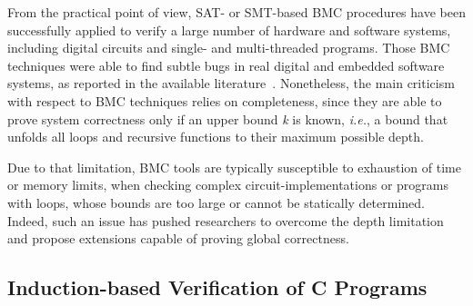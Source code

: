 \documentclass[format=acmsmall, review=false, screen=true]{acmart}
\begin{document}
From the practical point of view, SAT- or SMT-based BMC procedures have been successfully applied to verify a large number of hardware and software systems, including digital circuits and single- and multi-threaded programs. Those BMC techniques were able to find subtle bugs in real digital and embedded software systems, as reported in the available literature~\cite{Clarke04,MerzFS12,CordeiroF11,Ivancic05,Cordeiro12}. Nonetheless, the main criticism with respect to BMC techniques relies on completeness, since they are able to prove system correctness only if an upper bound \textit{k} is known, {\it i.e.}, a bound that unfolds all loops and recursive functions to their maximum possible depth. 

Due to that limitation, BMC tools are typically susceptible to exhaustion of time or memory limits, when checking complex circuit-implementations or programs with loops, whose bounds are too large or cannot be statically determined. Indeed, such an issue has pushed researchers to overcome the depth limitation and propose extensions capable of proving global correctness.

\subsection{Induction-based Verification of C Programs}
\end{document}
